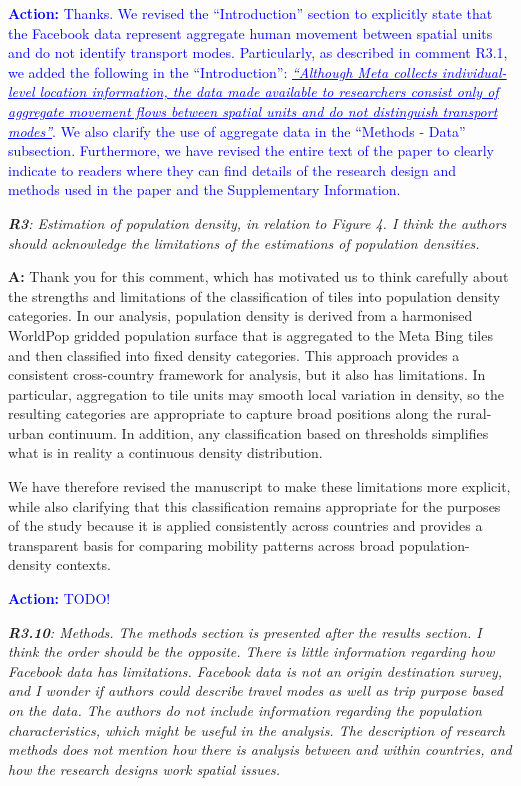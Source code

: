 \documentclass[12pt,a4paper,oneside, reqno]{amsart}
\begin{document}
\textcolor{blue}{
\textbf{Action:} Thanks. We revised the ``Introduction'' section to explicitly state that the Facebook data represent aggregate human movement between spatial units and do not identify transport modes. Particularly, as described in comment R3.1, we added the following in the ``Introduction'': \textit{\uline{``Although Meta collects individual-level location information, the data made available to researchers consist only of aggregate movement flows between spatial units and do not distinguish transport modes''}}. We also clarify the use of aggregate data in the ``Methods - Data'' subsection. Furthermore, we have revised the entire text of the paper to clearly indicate to readers where they can find details of the research design and methods used in the paper and the Supplementary Information.
}

\setlength{\leftskip}{1cm} \textit{\textbf{R3}: Estimation of population density, in relation to Figure 4. I think the authors should acknowledge the limitations of the estimations of population densities.}

\setlength{\leftskip}{1cm}\textbf{A:} Thank you for this comment, which has motivated us to think carefully about the strengths and limitations of the classification of tiles into population density categories. In our analysis, population density is derived from a harmonised WorldPop gridded population surface that is aggregated to the Meta Bing tiles and then classified into fixed density categories. This approach provides a consistent cross-country framework for analysis, but it also has limitations. In particular, aggregation to tile units may smooth local variation in density, so the resulting categories are appropriate to capture broad positions along the rural-urban continuum. In addition, any classification based on thresholds simplifies what is in reality a continuous density distribution.

We have therefore revised the manuscript to make these limitations more explicit, while also clarifying that this classification remains appropriate for the purposes of the study because it is applied consistently across countries and provides a transparent basis for comparing mobility patterns across broad population-density contexts.

\textcolor{blue}{\textbf{Action:} TODO!}

\setlength{\leftskip}{0cm} \textit{\textbf{R3.10}: Methods. The methods section is presented after the results section. I think the order should be the opposite. There is little information regarding how Facebook data has limitations. Facebook data is not an origin destination survey, and I wonder if authors could describe travel modes as well as trip purpose based on the data. The authors do not include information regarding the population characteristics, which might be useful in the analysis. The description of research methods does not mention how there is analysis between and within countries, and how the research designs work spatial issues.}
\end{document}
